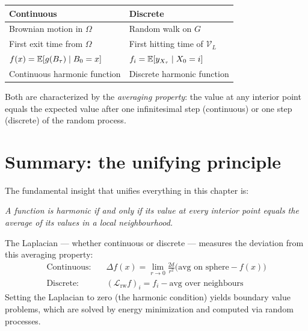 \begin{notechapter}
\begin{keyidea}
\begin{center}
\begin{tabular}{ll}
\toprule
Continuous & Discrete \\
\midrule
Brownian motion in $\Omega$ & Random walk on $G$ \\
First exit time from $\Omega$ & First hitting time of $\mathcal{V}_L$ \\
$f(x) = \mathbb{E}[g(B_\tau) \mid B_0 = x]$ &
$f_i = \mathbb{E}[y_{X_\tau} \mid X_0 = i]$ \\
Continuous harmonic function & Discrete harmonic function \\
\bottomrule
\end{tabular}
\end{center}
Both are characterized by the \emph{averaging property}: the value at any
interior point equals the expected value after one infinitesimal step
(continuous) or one step (discrete) of the random process.
\end{keyidea}


\section{Summary: the unifying principle}
\label{harmonic-functions:sec:summary}

The fundamental insight that unifies everything in this chapter is:

\begin{intuition}
\emph{A function is harmonic if and only if its value at every interior
point equals the average of its values in a local neighbourhood.}

The Laplacian --- whether continuous or discrete --- measures the deviation
from this averaging property:
\begin{align}
\text{Continuous:}\quad & \Delta f(x)
  = \lim_{r \to 0} \frac{2d}{r^2}
    \bigl(\text{avg on sphere} - f(x)\bigr) \\
\text{Discrete:}\quad & (\mathcal{L}_{\mathrm{rw}} f)_i
  = f_i - \text{avg over neighbours}
\end{align}
Setting the Laplacian to zero (the harmonic condition) yields boundary value
problems, which are solved by energy minimization and computed via random
processes.
\end{intuition}


\end{notechapter}
